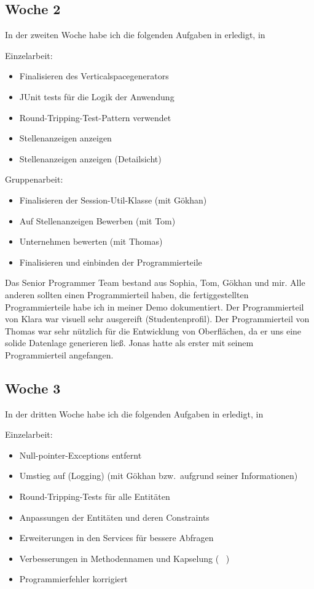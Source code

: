 \subsection{Woche 2}\label{subsec:s2w2}
In der zweiten Woche habe ich die folgenden Aufgaben in erledigt, in

Einzelarbeit:
\begin{itemize}
    \item Finalisieren des Verticalspacegenerators
    \item JUnit tests für die Logik der Anwendung
    \item Round-Tripping-Test-Pattern verwendet
    \item Stellenanzeigen anzeigen
    \item Stellenanzeigen anzeigen (Detailsicht)

\end{itemize}

Gruppenarbeit:

\begin{itemize}
    \item Finalisieren der Session-Util-Klasse (mit Gökhan)
    \item Auf Stellenanzeigen Bewerben (mit Tom)
    \item Unternehmen bewerten (mit Thomas)
    \item Finalisieren und einbinden der Programmierteile
\end{itemize}
Das Senior Programmer Team bestand aus Sophia, Tom, Gökhan und mir.
Alle anderen sollten einen Programmierteil haben, die fertiggestellten Programmierteile habe ich
in meiner Demo\cite*[]{demo1} dokumentiert.
Der Programmierteil von Klara war visuell sehr ausgereift (Studentenprofil).
Der Programmierteil von Thomas war sehr nützlich für die Entwicklung von Oberflächen, da er uns
eine solide Datenlage generieren ließ.
Jonas hatte als erster mit seinem Programmierteil angefangen.

\subsection{Woche 3}\label{subsec:s2w3}
In der dritten Woche habe ich die folgenden Aufgaben in erledigt, in

Einzelarbeit:
\begin{itemize}
    \item Null-pointer-Exceptions entfernt
    \item Umstieg auf  (Logging) (mit Gökhan bzw.\ aufgrund seiner Informationen)
    \item Round-Tripping-Tests für alle Entitäten
    \item Anpassungen der Entitäten und deren Constraints
    \item Erweiterungen in den Services für bessere Abfragen
    \item Verbesserungen in Methodennamen und Kapselung ( \textrightarrow \ )
    \item Programmierfehler korrigiert
\end{itemize}

